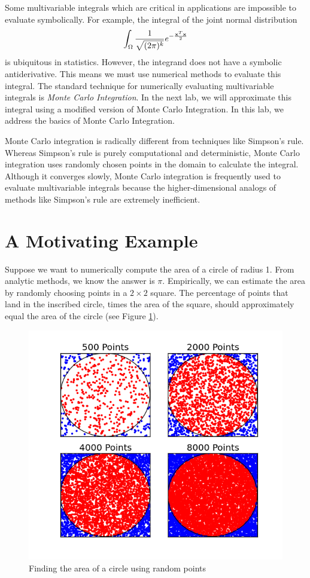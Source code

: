 
Some multivariable integrals which are critical in applications are impossible to evaluate symbolically.
For example, the integral of the joint normal distribution
\[
\int_{\Omega} \frac{1}{\sqrt{(2 \pi)^k}} e^{- \frac{\bold{x}^T\bold{x}}{2}}
\]
is ubiquitous in statistics.
However, the integrand does not have a symbolic antiderivative.
This means we must use numerical methods to evaluate this integral. The standard technique for numerically evaluating multivariable integrals is \emph{Monte Carlo Integration}. In the next lab, we will approximate this integral using a modified version of Monte Carlo Integration. In this lab, we address the basics of Monte Carlo Integration.

Monte Carlo integration is radically different from techniques like Simpson's rule. Whereas Simpson's rule is purely computational and deterministic, Monte Carlo integration uses randomly chosen points  in the domain to calculate the integral.
Although it converges slowly, Monte Carlo integration is frequently used to evaluate multivariable integrals because the higher-dimensional analogs of methods like Simpson's rule are extremely inefficient. 

\section*{A Motivating Example}
Suppose we want to numerically compute the area of a circle of radius 1.
From analytic methods, we know the answer is $\pi$.
Empirically, we can estimate the area by randomly choosing points in a $2 \times 2$ square.
The percentage of points that land in the inscribed circle, times the area of the square, should approximately equal the area of the circle (see Figure \ref{fig:MCCircle}).

\begin{figure}
\includegraphics[width=.7\textwidth]{MC.png}
\caption{Finding the area of a circle using random points}
\label{fig:MCCircle}
\end{figure}

